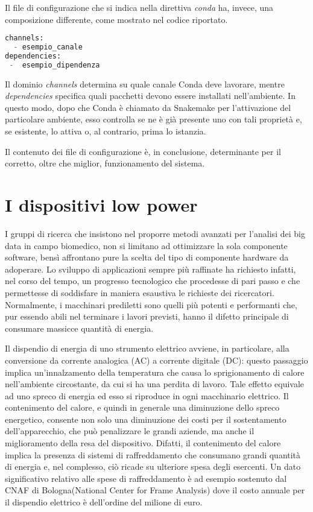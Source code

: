 Il file di configurazione che si indica nella direttiva \textit{conda} ha, invece, una composizione differente, come mostrato nel codice riportato.
\begin{lstlisting}[language=Python]
channels:
  - esempio_canale
dependencies:
 -  esempio_dipendenza
\end{lstlisting}
Il dominio \textit{channels} determina su quale canale Conda deve lavorare, mentre \textit{dependencies} specifica quali pacchetti devono essere installati nell'ambiente.
In questo modo, dopo che Conda è chiamato da Snakemake per l'attivazione del particolare ambiente, esso controlla se ne è già presente uno con tali proprietà e, se esistente, lo attiva o, al contrario, prima lo istanzia.

Il contenuto dei file di configurazione è, in conclusione, determinante per il corretto, oltre che miglior, funzionamento del sistema.

\section{I dispositivi low power}
\label{sec:LP}
I gruppi di ricerca che insistono nel proporre metodi avanzati per l'analisi dei big data in campo biomedico, non si limitano ad ottimizzare la sola componente software, bensì affrontano pure la scelta del tipo di componente hardware da adoperare.
Lo sviluppo di applicazioni sempre più raffinate ha richiesto infatti, nel corso del tempo, un progresso tecnologico che procedesse di pari passo e che permettesse di soddisfare in maniera esaustiva le richieste dei ricercatori.
Normalmente, i macchinari prediletti sono quelli più potenti e performanti che, pur essendo abili nel terminare i lavori previsti, hanno il difetto principale di consumare massicce quantità di energia.

Il dispendio di energia di uno strumento elettrico avviene, in particolare, alla conversione da corrente analogica (AC) a corrente digitale (DC): questo passaggio implica un'innalzamento della temperatura che causa lo sprigionamento di calore nell'ambiente circostante, da cui si ha una perdita di lavoro.
Tale effetto equivale ad uno spreco di energia ed esso si riproduce in ogni macchinario elettrico.
Il contenimento del calore, e quindi in generale una diminuzione dello spreco energetico, consente non solo una diminuzione dei costi per il sostentamento dell'apparecchio, che può penalizzare le grandi aziende, ma anche il miglioramento della resa del dispositivo.
Difatti, il contenimento del calore implica la presenza di sistemi di raffreddamento che consumano grandi quantità di energia e, nel complesso, ciò ricade su ulteriore spesa degli esercenti.
Un dato significativo relativo alle spese di raffreddamento è ad esempio sostenuto dal CNAF di Bologna(National Center for Frame Analysis) dove il costo annuale per il dispendio elettrico è dell'ordine del milione di euro.

